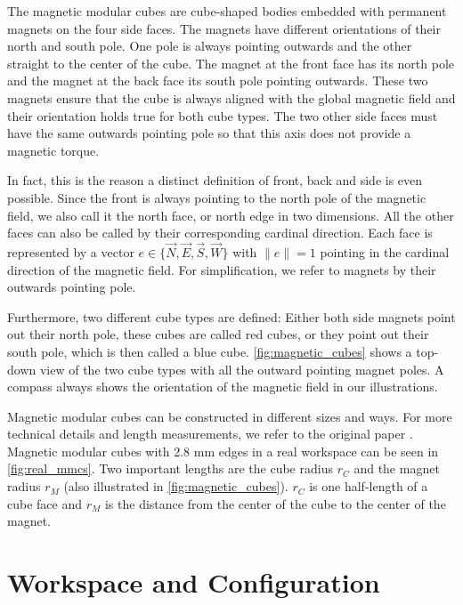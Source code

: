The magnetic modular cubes are cube-shaped bodies embedded with permanent magnets on the four side faces.
The magnets have different orientations of their north and south pole. 
One pole is always pointing outwards and the other straight to the center of the cube.
The magnet at the front face has its north pole and the magnet at the back face its south pole pointing outwards.
These two magnets ensure that the cube is always aligned with the global magnetic field and their orientation holds true for both cube types.
The two other side faces must have the same outwards pointing pole so that this axis does not provide a magnetic torque.

In fact, this is the reason a distinct definition of front, back and side is even possible.
Since the front is always pointing to the north pole of the magnetic field, we also call it the north face, or north edge in two dimensions.
All the other faces can also be called by their corresponding cardinal direction.
Each face is represented by a vector $e \in \{ \vec{N},\vec{E},\vec{S},\vec{W}\}$ with $\lVert e \rVert = 1$ pointing in the cardinal direction of the magnetic field.
For simplification, we refer to magnets by their outwards pointing pole.

Furthermore, two different cube types are defined:
Either both side magnets point out their north pole, these cubes are called red cubes, or they point out their south pole, which is then called a blue cube.
\autoref{fig:magnetic_cubes} shows a top-down view of the two cube types with all the outward pointing magnet poles.
A compass always shows the orientation of the magnetic field in our illustrations.

Magnetic modular cubes can be constructed in different sizes and ways. For more technical details and length measurements, we refer to the original paper \cite{Bhattacharjee2022}.
Magnetic modular cubes with 2.8 mm edges in a real workspace can be seen in \autoref{fig:real_mmcs}.
Two important lengths are the cube radius $r_C$ and the magnet radius $r_M$ (also illustrated in \autoref{fig:magnetic_cubes}).
$r_C$ is one half-length of a cube face and $r_M$ is the distance from the center of the cube to the center of the magnet.



\section{Workspace and Configuration}
\label{sec:workspace}

